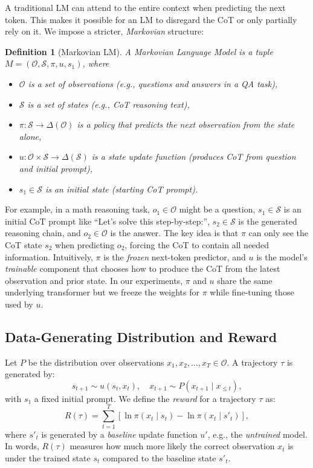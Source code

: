 \documentclass[letterpaper]{article} %
\newtheorem{definition}{Definition}[section]
\begin{document}
A traditional LM can attend to the entire context when predicting the next token. This makes it possible for an LM to disregard the CoT or only partially rely on it. We impose a stricter, \emph{Markovian} structure:

\begin{definition}[Markovian LM]
A Markovian Language Model is a tuple $M=(\mathcal{O}, \mathcal{S}, \pi, u, s_1)$, where
\begin{itemize}
\item $\mathcal{O}$ is a set of observations (e.g., questions and answers in a QA task),
\item $\mathcal{S}$ is a set of states (e.g., CoT reasoning text),
\item $\pi: \mathcal{S}\rightarrow \Delta(\mathcal{O})$ is a policy that predicts the next observation from the state alone,
\item $u: \mathcal{O}\times\mathcal{S}\rightarrow \Delta(\mathcal{S})$ is a state update function (produces CoT from question and initial prompt),
\item $s_1\in \mathcal{S}$ is an initial state (starting CoT prompt).
\end{itemize}
\end{definition}

For example, in a math reasoning task, $o_1 \in \mathcal{O}$ might be a question, $s_1 \in \mathcal{S}$ is an initial CoT prompt like ``Let's solve this step-by-step:'', $s_2 \in \mathcal{S}$ is the generated reasoning chain, and $o_2 \in \mathcal{O}$ is the answer. The key idea is that $\pi$ can only see the CoT state $s_2$ when predicting $o_2$, forcing the CoT to contain all needed information. Intuitively, $\pi$ is the \emph{frozen} next-token predictor, and $u$ is the model's \emph{trainable} component that chooses how to produce the CoT from the latest observation and prior state. In our experiments, $\pi$ and $u$ share the same underlying transformer but we freeze the weights for $\pi$ while fine-tuning those used by $u$. 

\subsection{Data-Generating Distribution and Reward}

Let $P$ be the distribution over observations $x_1, x_2, \dots, x_T \in \mathcal{O}$. A trajectory $\tau$ is generated by:
\[
s_{t+1}\sim u(s_t, x_t), \quad x_{t+1}\sim P(x_{t+1}\mid x_{\le t}),
\]
with $s_1$ a fixed initial prompt. We define the \emph{reward} for a trajectory $\tau$ as:
\[
R(\tau)=\sum_{t=1}^T \left[\ln \pi(x_t\mid s_t)-\ln \pi(x_t\mid s'_t)\right],
\]
where $s'_t$ is generated by a \emph{baseline} update function $u'$, e.g., the \emph{untrained} model. In words, $R(\tau)$ measures how much more likely the correct observation $x_t$ is under the trained state $s_t$ compared to the baseline state $s'_t$.
\end{document}
